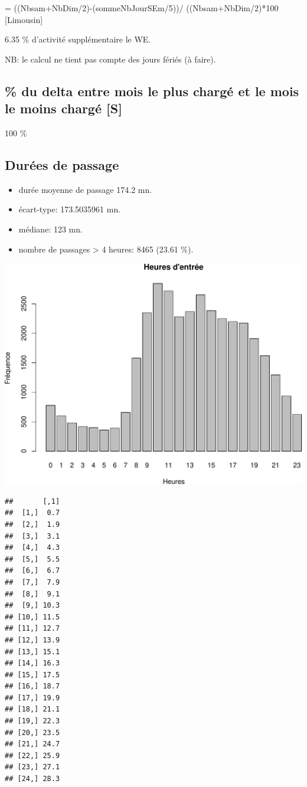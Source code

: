 \documentclass[]{article}
\begin{document}
= ((Nbsam+NbDim/2)-(sommeNbJourSEm/5))/ ((Nbsam+NbDim/2)*100
{[}Limousin{]}

6.35 \% d'activité supplémentaire le WE.

NB: le calcul ne tient pas compte des jours fériés (à faire).

\subsection{\% du delta entre mois le plus chargé et le mois le moins
chargé
{[}S{]}}\label{du-delta-entre-mois-le-plus-charge-et-le-mois-le-moins-charge-s}

100 \%

\subsection{Durées de passage}\label{durees-de-passage}

\begin{itemize}
\itemsep1pt\parskip0pt
\item
  durée moyenne de passage 174.2 mn.
\item
  écart-type: 173.5035961 mn.
\item
  médiane: 123 mn.
\item
  nombre de passages \textgreater{} 4 heures: 8465 (23.61 \%).
\end{itemize}

\includegraphics{rapport_2014_files/figure-latex/horaires-1.pdf}

\begin{verbatim}
##       [,1]
##  [1,]  0.7
##  [2,]  1.9
##  [3,]  3.1
##  [4,]  4.3
##  [5,]  5.5
##  [6,]  6.7
##  [7,]  7.9
##  [8,]  9.1
##  [9,] 10.3
## [10,] 11.5
## [11,] 12.7
## [12,] 13.9
## [13,] 15.1
## [14,] 16.3
## [15,] 17.5
## [16,] 18.7
## [17,] 19.9
## [18,] 21.1
## [19,] 22.3
## [20,] 23.5
## [21,] 24.7
## [22,] 25.9
## [23,] 27.1
## [24,] 28.3
\end{verbatim}
\end{document}
